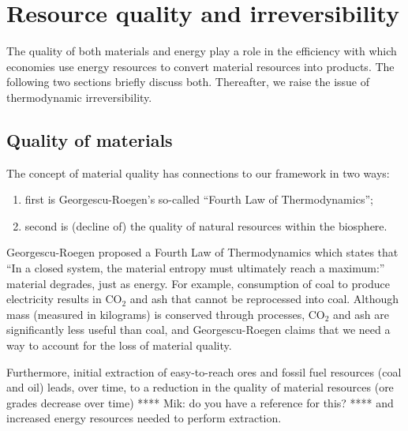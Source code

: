 \section{Resource quality and irreversibility}
\label{sec:resource_quality_and_irreversibility}

The quality of both materials 
and energy play a role in the 
efficiency with which economies use energy resources to convert material resources into products.
The following two sections briefly discuss both.
Thereafter, we raise the issue of thermodynamic 
irreversibility.

\subsection{Quality of materials}
\label{sec:material_quality}


The concept of material quality has connections to our framework in two ways:
\begin{enumerate}
	\item 
		first is Georgescu-Roegen's so-called ``Fourth Law of
		Thermodynamics'';
	\item		
		second is (decline of) the quality of 
		natural resources	within the biosphere.
\end{enumerate}

Georgescu-Roegen proposed a 
Fourth Law of Thermodynamics
which states that ``In a closed system, 
the material entropy must ultimately reach a maximum:'' 
material degrades, just as energy.\cite{GeorgescuRoegen:1977tf}
For example, consumption of coal to produce electricity
results in CO$_2$ and ash that cannot
be reprocessed into coal.
Although mass (measured in kilograms) is conserved through processes, 
CO$_2$ and ash are significantly less useful than coal,
and Georgescu-Roegen claims that we need a way to account
for the loss of material quality.

Furthermore, initial extraction of easy-to-reach ores 
and fossil fuel resources (coal and oil)
leads, over time, to a reduction in the quality 
of material resources (ore grades decrease over time) 
**** Mik: do you have a reference for this? ****
and increased energy resources needed to perform extraction.


